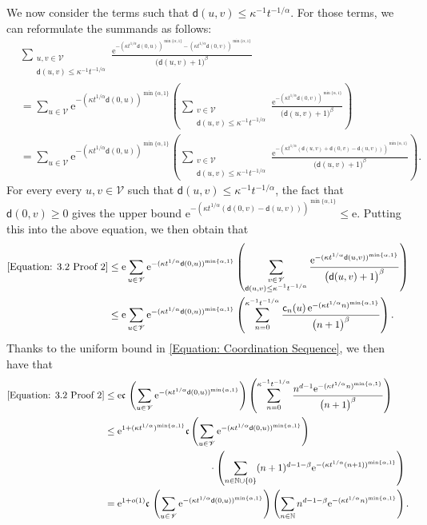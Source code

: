 \documentclass{amsart}
\numberwithin{equation}{section}
\theoremstyle{definition}
\newcommand\al{\alpha}
\newcommand\be{\beta}
\newcommand\ka{\kappa}
\newcommand\mbb{\mathbb}
\newcommand\mf{\mathfrak}
\newcommand\mr{\mathrm}
\newcommand\ms{\mathscr}
\newcommand\msf{\mathsf}
\begin{document}
We now consider the terms such that $\msf d(u,v)\leq\ka^{-1}t^{-1/\al}$. For those terms,
we can reformulate the summands as follows:
\begin{align}
\label{Equation: 3.2 Proof 2}
&\sum_{\substack{u,v\in\ms V\\\msf d(u,v)\leq \ka^{-1}t^{-1/\al}}}\frac{\mr e^{-(\ka t^{1/\al}\msf d(0,u))^{\min\{\al,1\}}-(\ka t^{1/\al}\msf d(0,v))^{\min\{\al,1\}}}}{
\big(\msf d(u,v)+1\big)^{\be}}\\
\nonumber
&=\sum_{u\in\ms V}\mr e^{-(\ka t^{1/\al}\msf d(0,u))^{\min\{\al,1\}}}
\left(\sum_{\substack{v\in\ms V\\\msf d(u,v)\leq \ka^{-1}t^{-1/\al}}}\frac{\mr e^{-(\ka t^{1/\al}\msf d(0,v))^{\min\{\al,1\}}}}{
\big(\msf d(u,v)+1\big)^{\be}}\right)\\
\nonumber
&=\sum_{u\in\ms V}\mr e^{-(\ka t^{1/\al}\msf d(0,u))^{\min\{\al,1\}}}
\left(\sum_{\substack{v\in\ms V\\\msf d(u,v)\leq \ka^{-1}t^{-1/\al}}}\frac{\mr e^{-(\ka t^{1/\al}(\msf d(u,v)+\msf d(0,v)-\msf d(u,v)))^{\min\{\al,1\}}}}{
\big(\msf d(u,v)+1\big)^{\be}}\right).
\end{align}
For every every $u,v\in\ms V$ such that $\msf d(u,v)\leq \ka^{-1}t^{-1/\al}$, the fact that $\msf d(0,v)\geq0$ gives the upper bound
$\mr e^{-(\ka t^{1/\al}(\msf d(0,v)-\msf d(u,v)))^{\min\{\al,1\}}}\leq\mr e$. Putting this into the above equation, we then obtain that
\begin{align*}
\eqref{Equation: 3.2 Proof 2}&\leq\mr e\sum_{u\in\ms V}\mr e^{-(\ka t^{1/\al}\msf d(0,u))^{\min\{\al,1\}}}
\left(\sum_{\substack{v\in\ms V\\\msf d(u,v)\leq \ka^{-1}t^{-1/\al}}}\frac{\mr e^{-(\ka t^{1/\al}\msf d(u,v))^{\min\{\al,1\}}}}{
\big(\msf d(u,v)+1\big)^{\be}}\right)\\
&\leq\mr e\sum_{u\in\ms V}\mr e^{-(\ka t^{1/\al}\msf d(0,u))^{\min\{\al,1\}}}
\left(\sum_{n=0}^{\ka^{-1}t^{-1/\al}}\frac{\msf c_n(u)\,\mr e^{-(\ka t^{1/\al}n)^{\min\{\al,1\}}}}{
\big(n+1\big)^{\be}}\right).
\end{align*}
Thanks to the uniform bound in \eqref{Equation: Coordination Sequence},
we then have that
\begin{align}
\label{Equation: 3.2 Proof 3}
\nonumber
\eqref{Equation: 3.2 Proof 2}&\leq\mr e \mf c\,\left(\sum_{u\in\ms V}\mr e^{-(\ka t^{1/\al}\msf d(0,u))^{\min\{\al,1\}}}\right)
\left(\sum_{n=0}^{\ka^{-1}t^{-1/\al}}\frac{n^{d-1}\mr e^{-(\ka t^{1/\al}n)^{\min\{\al,1\}}}}{
\big(n+1\big)^{\be}}\right)\\
\nonumber
&\leq \mr e^{1+(\ka t^{1/\al})^{\min\{\al,1\}}} \mf c\left(\sum_{u\in\ms V}\mr e^{-(\ka t^{1/\al}\msf d(0,u))^{\min\{\al,1\}}}\right)\\
&\nonumber\hspace{1.5in}
\cdot\left(\sum_{n\in\mbb N\cup\{0\}}(n+1)^{d-1-\be}\mr e^{-(\ka t^{1/\al}(n+1))^{\min\{\al,1\}}}\right)\\
&=\mr e^{1+o(1)} \mf c\,\left(\sum_{u\in\ms V}\mr e^{-(\ka t^{1/\al}\msf d(0,u))^{\min\{\al,1\}}}\right)
\left(\sum_{n\in \mbb N}n^{d-1-\be}\mr e^{-(\ka t^{1/\al} n)^{\min\{\al,1\}}}\right).
\end{align}
\end{document}
